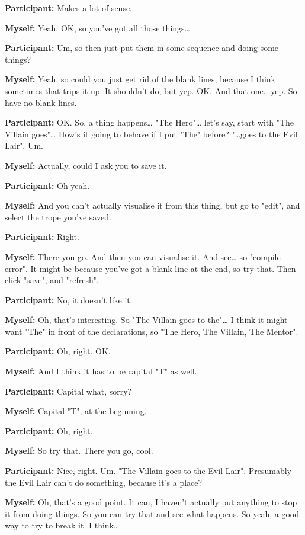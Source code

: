 \documentclass[11pt]{report}
\newcommand{\llabel}[1]{\hypertarget{llineno:#1}{\linelabel{#1}}}
\begin{document}
\begin{linenumbers}
\textbf{Participant:} Makes a lot of sense.

\textbf{Myself:} Yeah. OK, so you've got all those things\ldots{}

\textbf{Participant:} Um, so then just put them in some sequence and doing some things?

\textbf{Myself:} Yeah, so could you just get rid of the blank lines, because I think sometimes that trips it up. It shouldn't do, but yep. OK. And that one.. yep. So have no blank lines.

\textbf{Participant:} OK. So, a thing happens\ldots{} "The Hero"\ldots{} let's say, start with "The Villain goes"\ldots{} How's it going to behave if I put "The" before? "\ldots{}goes to the Evil Lair". Um.

\textbf{Myself:} Actually, could I ask you to save it.

\textbf{Participant:} Oh yeah.

\textbf{Myself:} And you can't actually visualise it from this thing, but go to "edit", and select the trope you've saved.

\textbf{Participant:} Right.

\textbf{Myself:} There you go. And then you can visualise it. And see\ldots{} so "compile error". It might be because you've got a blank line at the end, so try that. Then click "save", and "refresh".

\textbf{Participant:} No, it doesn't like it.

\textbf{Myself:} Oh, that's interesting. So "The Villain goes to the"\ldots{} I think it might want "The" in front of the declarations, so "The Hero, The Villain, The Mentor".

\textbf{Participant:} Oh, right. OK.

\textbf{Myself:} And I think it has to be capital "T" as well.\llabel{lne:syntax5d}

\textbf{Participant:} Capital what, sorry?

\textbf{Myself:} Capital "T", at the beginning.

\textbf{Participant:} Oh, right.

\textbf{Myself:} So try that. There you go, cool.

\textbf{Participant:} Nice, right. Um. "The Villain goes to the Evil Lair".
Presumably the Evil Lair can't do something, because it's a
place?\llabel{lne:feature6d}

\textbf{Myself:} Oh, that's a good point. It can, I haven't actually put anything to stop it from doing things. So you can try that and see what happens. So yeah, a good way to try to break it. I think\ldots{}


\end{linenumbers}
\end{document}
